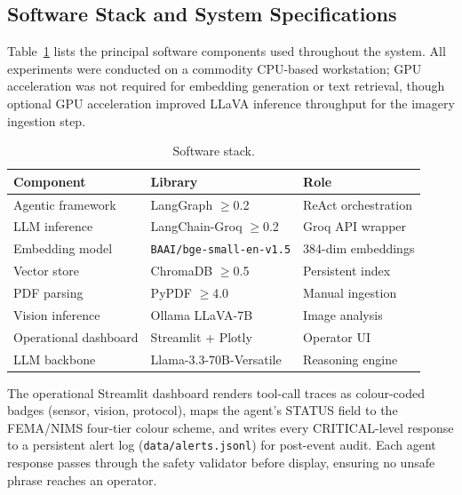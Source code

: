 \subsection{Software Stack and System Specifications}

Table~\ref{tab:stack} lists the principal software components used throughout
the system. All experiments were conducted on a commodity CPU-based
workstation; GPU acceleration was not required for embedding generation or
text retrieval, though optional GPU acceleration improved LLaVA inference
throughput for the imagery ingestion step.

\begin{table}[ht]
\centering
\caption{Software stack.}
\label{tab:stack}
\renewcommand{\arraystretch}{1.2}
\setlength{\tabcolsep}{4pt}
\begin{tabular}{@{}lll@{}}
\toprule
\textbf{Component}     & \textbf{Library}                    & \textbf{Role} \\ \midrule
Agentic framework      & LangGraph $\geq$0.2                 & ReAct orchestration \\
LLM inference          & LangChain-Groq $\geq$0.2            & Groq API wrapper \\
Embedding model        & \texttt{BAAI/bge-small-en-v1.5}     & 384-dim embeddings \\
Vector store           & ChromaDB $\geq$0.5                  & Persistent index \\
PDF parsing            & PyPDF $\geq$4.0                     & Manual ingestion \\
Vision inference       & Ollama LLaVA-7B                     & Image analysis \\
Operational dashboard  & Streamlit + Plotly                  & Operator UI \\
LLM backbone           & Llama-3.3-70B-Versatile             & Reasoning engine \\ \bottomrule
\end{tabular}
\end{table}

The operational Streamlit dashboard renders tool-call traces as colour-coded
badges (sensor, vision, protocol), maps the agent's STATUS field to the
FEMA/NIMS four-tier colour scheme, and writes every CRITICAL-level response
to a persistent alert log (\texttt{data/alerts.jsonl}) for post-event audit.
Each agent response passes through the safety validator before display,
ensuring no unsafe phrase reaches an operator.
